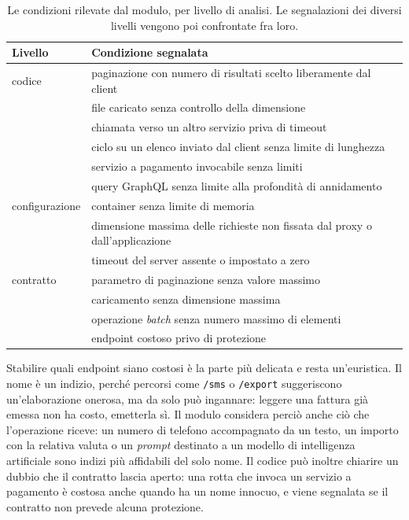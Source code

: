 \begin{table}[htbp]
  \centering
  \small
  \linespread{1.0}\selectfont
  \begin{tabularx}{\linewidth}{@{}l X@{}}
    \toprule
    \textbf{Livello} & \textbf{Condizione segnalata} \\
    \midrule
    codice & paginazione con numero di risultati scelto liberamente dal client \\
    & file caricato senza controllo della dimensione \\
    & chiamata verso un altro servizio priva di timeout \\
    & ciclo su un elenco inviato dal client senza limite di lunghezza \\
    & servizio a pagamento invocabile senza limiti \\
    & query GraphQL senza limite alla profondità di annidamento \\
    \midrule
    configurazione & container senza limite di memoria \\
    & dimensione massima delle richieste non fissata dal proxy o
    dall'applicazione \\
    & timeout del server assente o impostato a zero \\
    \midrule
    contratto & parametro di paginazione senza valore massimo \\
    & caricamento senza dimensione massima \\
    & operazione \emph{batch} senza numero massimo di elementi \\
    & endpoint costoso privo di protezione \\
    \bottomrule
  \end{tabularx}
  \caption[Condizioni rilevate dal modulo Unrestricted Resource
  Consumption]{Le condizioni rilevate dal modulo, per livello di analisi.
  Le segnalazioni dei diversi livelli vengono poi confrontate fra loro.}
  \label{tab:livelli-resource}
\end{table}

Stabilire quali endpoint siano costosi è la parte più delicata e resta
un'euristica. Il nome è un indizio, perché percorsi come \texttt{/sms} o
\texttt{/export} suggeriscono un'elaborazione onerosa, ma da solo può
ingannare: leggere una fattura già emessa non ha costo, emetterla sì. Il modulo
considera perciò anche ciò che l'operazione riceve: un numero di telefono
accompagnato da un testo, un importo con la relativa valuta o un \emph{prompt}
destinato a un modello di intelligenza artificiale sono indizi più affidabili
del solo nome. Il codice può inoltre chiarire un dubbio che il contratto lascia
aperto: una rotta che invoca un servizio a pagamento è costosa anche quando ha
un nome innocuo, e viene segnalata se il contratto non prevede alcuna
protezione.

